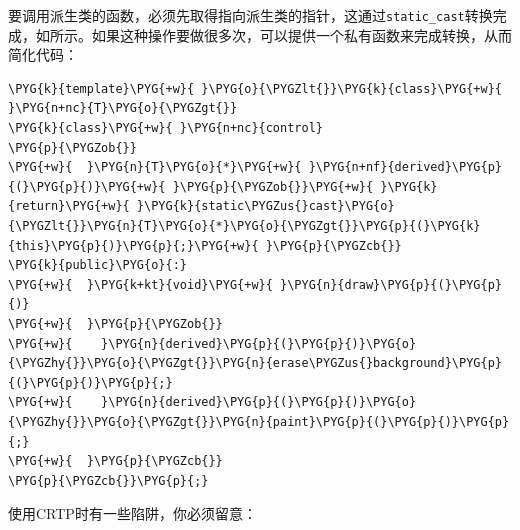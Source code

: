 要调用派生类的函数，必须先取得指向派生类的指针，这通过\texttt{static\_\allowbreak{}cast}转换完成，如所示。如果这种操作要做很多次，可以提供一个私有函数来完成转换，从而简化代码：



\begin{codeblockbg}
\begin{Verbatim}[commandchars=\\\{\},breaklines=true,breakanywhere=true,fontsize=\codefont,xleftmargin=17bp]
\PYG{k}{template}\PYG{+w}{ }\PYG{o}{\PYGZlt{}}\PYG{k}{class}\PYG{+w}{ }\PYG{n+nc}{T}\PYG{o}{\PYGZgt{}}
\PYG{k}{class}\PYG{+w}{ }\PYG{n+nc}{control}
\PYG{p}{\PYGZob{}}
\PYG{+w}{  }\PYG{n}{T}\PYG{o}{*}\PYG{+w}{ }\PYG{n+nf}{derived}\PYG{p}{(}\PYG{p}{)}\PYG{+w}{ }\PYG{p}{\PYGZob{}}\PYG{+w}{ }\PYG{k}{return}\PYG{+w}{ }\PYG{k}{static\PYGZus{}cast}\PYG{o}{\PYGZlt{}}\PYG{n}{T}\PYG{o}{*}\PYG{o}{\PYGZgt{}}\PYG{p}{(}\PYG{k}{this}\PYG{p}{)}\PYG{p}{;}\PYG{+w}{ }\PYG{p}{\PYGZcb{}}
\PYG{k}{public}\PYG{o}{:}
\PYG{+w}{  }\PYG{k+kt}{void}\PYG{+w}{ }\PYG{n}{draw}\PYG{p}{(}\PYG{p}{)}
\PYG{+w}{  }\PYG{p}{\PYGZob{}}
\PYG{+w}{    }\PYG{n}{derived}\PYG{p}{(}\PYG{p}{)}\PYG{o}{\PYGZhy{}}\PYG{o}{\PYGZgt{}}\PYG{n}{erase\PYGZus{}background}\PYG{p}{(}\PYG{p}{)}\PYG{p}{;}
\PYG{+w}{    }\PYG{n}{derived}\PYG{p}{(}\PYG{p}{)}\PYG{o}{\PYGZhy{}}\PYG{o}{\PYGZgt{}}\PYG{n}{paint}\PYG{p}{(}\PYG{p}{)}\PYG{p}{;}
\PYG{+w}{  }\PYG{p}{\PYGZcb{}}
\PYG{p}{\PYGZcb{}}\PYG{p}{;}
\end{Verbatim}
\end{codeblockbg}



使用CRTP时有一些陷阱，你必须留意：



